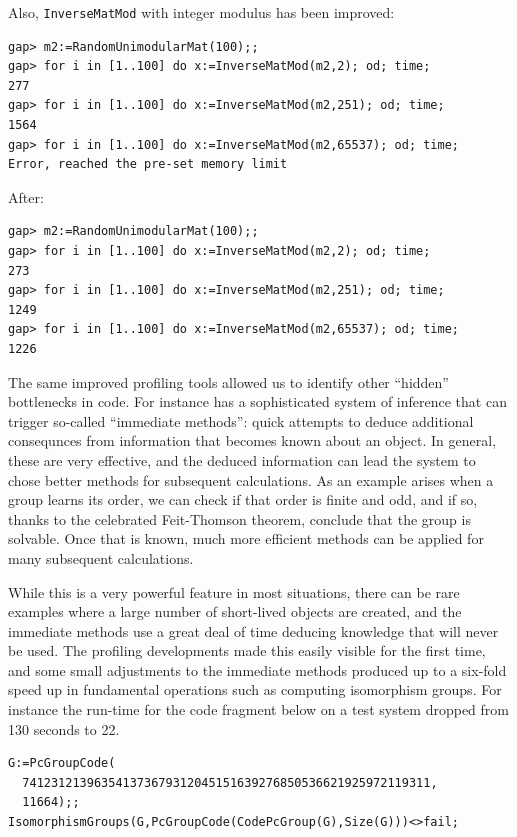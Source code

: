 \documentclass{deliverablereport}
\begin{document}
Also, \verb|InverseMatMod| with integer modulus has been improved:%


{\small
\begin{verbatim}
gap> m2:=RandomUnimodularMat(100);;
gap> for i in [1..100] do x:=InverseMatMod(m2,2); od; time;
277
gap> for i in [1..100] do x:=InverseMatMod(m2,251); od; time;
1564
gap> for i in [1..100] do x:=InverseMatMod(m2,65537); od; time;
Error, reached the pre-set memory limit
\end{verbatim}
}

After:

{\small
\begin{verbatim}
gap> m2:=RandomUnimodularMat(100);;
gap> for i in [1..100] do x:=InverseMatMod(m2,2); od; time;
273
gap> for i in [1..100] do x:=InverseMatMod(m2,251); od; time;
1249
gap> for i in [1..100] do x:=InverseMatMod(m2,65537); od; time;
1226
\end{verbatim}

}

The same improved profiling tools allowed us to identify other
``hidden'' bottlenecks in \GAP code. For instance \GAP has a
sophisticated system of inference that can trigger 
so-called ``immediate methods'': quick attempts to deduce additional
consequnces from information that becomes known about an object.
In general, these are very effective, and the deduced information can
lead the system to chose better methods for subsequent
calculations. As an example arises when a group learns its order, we
can check if that order is finite and odd, and if so, thanks to the celebrated
Feit-Thomson theorem, conclude that the group is solvable. Once that
is known, much more efficient methods can be applied for many
subsequent calculations.

While this is a very powerful feature in most situations, there can be
rare examples where a large number of short-lived objects are created,
and the immediate methods use a great deal of time deducing knowledge
that will never be used. The profiling developments made this 
easily visible for the first time, and some small adjustments to the
immediate methods produced up to a six-fold speed up in fundamental
operations such as computing isomorphism groups. For instance the
run-time for the code fragment below on a test system dropped from 130
seconds to 22.


{\small
\begin{verbatim}
G:=PcGroupCode( 
  741231213963541373679312045151639276850536621925972119311,
  11664);;
IsomorphismGroups(G,PcGroupCode(CodePcGroup(G),Size(G)))<>fail;
\end{verbatim}
}
\end{document}
